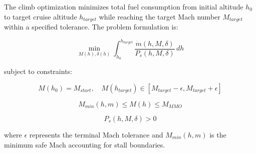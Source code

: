 The climb optimization minimizes total fuel consumption from initial altitude $h_0$ to target cruise altitude $h_{target}$ while reaching the target Mach number $M_{target}$ within a specified tolerance. The problem formulation is:

\begin{equation}
\min_{M(h), \delta(h)} \int_{h_0}^{h_{target}} \frac{\dot{m}(h, M, \delta)}{P_s(h, M, \delta)} \, dh
\end{equation}

subject to constraints:

\begin{equation}
M(h_0) = M_{start}, \quad M(h_{target}) \in [M_{target} - \epsilon, M_{target} + \epsilon]
\end{equation}

\begin{equation}
M_{min}(h, m) \leq M(h) \leq M_{MMO}
\end{equation}

\begin{equation}
P_s(h, M, \delta) > 0
\end{equation}

where $\epsilon$ represents the terminal Mach tolerance and $M_{min}(h, m)$ is the minimum safe Mach accounting for stall boundaries.
